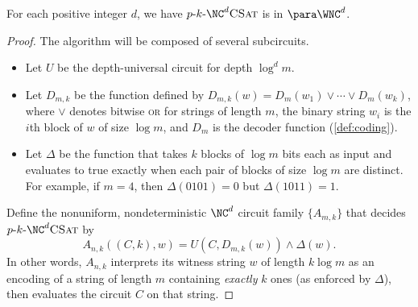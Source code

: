 \begin{lemma}\label{lem:pkncsatmem}
  For each positive integer $d$, we have $\pNCSAT$ is in $\para \WNC^d$.
\end{lemma}
\begin{proof}
  The algorithm will be composed of several subcircuits.
  \begin{itemize}
  \item Let $U$ be the depth-universal circuit \autocite{ch85} for depth $\log^d m$.
  \item Let $D_{m, k}$ be the function defined by $D_{m, k}(w) = D_m(w_1) \lor \dotsb \lor D_m(w_k)$, where $\lor$ denotes bitwise \textsc{or} for strings of length $m$, the binary string $w_i$ is the $i$th block of $w$ of size $\log m$, and $D_m$ is the decoder function (\autoref{def:coding}).
  \item Let $\Delta$ be the function that takes $k$ blocks of $\log m$ bits each as input and evaluates to true exactly when each pair of blocks of size $\log m$ are distinct. For example, if $m = 4$, then $\Delta(0101) = 0$ but $\Delta(1011) = 1$.
  \end{itemize}
  Define the nonuniform, nondeterministic $\NC^d$ circuit family $\{A_{m, k}\}$ that decides $\pNCSAT$ by
  \[
  A_{n, k}((C, k), w) = U(C, D_{m, k}(w)) \land \Delta(w).
  \]
  In other words, $A_{n, k}$ interprets its witness string $w$ of length $k \log m$ as an encoding of a string of length $m$ containing \emph{exactly} $k$ ones (as enforced by $\Delta$), then evaluates the circuit $C$ on that string.


\end{proof}
